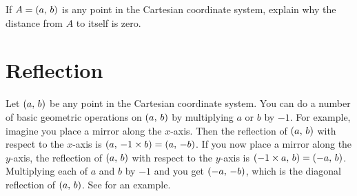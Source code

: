 \documentclass[a4paper,oneside,12pt]{article}
\begin{document}
\begin{exercise}
\label{ex:distance_from_point_to_itself_is_zero}
If $A = \left\lparen{a},\, {b}\right\rparen$ is any point in the Cartesian coordinate system,
explain why the distance from $A$ to itself is zero.
\end{exercise}




\section{Reflection}

Let $\left\lparen{a},\, {b}\right\rparen$ be any point in the Cartesian coordinate system.
You can do a number of basic geometric operations on $\left\lparen{a},\, {b}\right\rparen$ by
multiplying $a$ or $b$ by $-1$.  For example, imagine you place a
mirror along the $x$-axis.  Then the reflection of $\left\lparen{a},\, {b}\right\rparen$ with
respect to the $x$-axis is $\left\lparen{a},\, {-1 \times b}\right\rparen = \left\lparen{a},\, {-b}\right\rparen$.
If you now place a mirror along the $y$-axis, the reflection of
$\left\lparen{a},\, {b}\right\rparen$ with respect to the $y$-axis is
$\left\lparen{-1 \times a},\, {b}\right\rparen = \left\lparen{-a},\, {b}\right\rparen$.  Multiplying each of $a$ and
$b$ by $-1$ and you get $\left\lparen{-a},\, {-b}\right\rparen$, which is the diagonal
reflection of $\left\lparen{a},\, {b}\right\rparen$.  See 
for an example.
\end{document}
